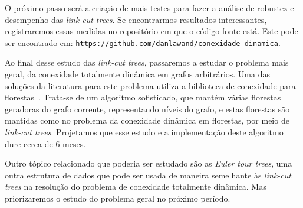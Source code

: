 O próximo passo será a criação de mais testes para fazer a análise de robustez e desempenho das \emph{link-cut trees}. Se encontrarmos resultados interessantes, registraremos essas medidas no repositório em que o código fonte está. Este pode ser encontrado em: \texttt{https://github.com/danlawand/conexidade-dinamica}.  

Ao final desse estudo das \emph{link-cut trees}, passaremos a estudar o problema mais geral, da conexidade totalmente dinâmica em grafos arbitrários.  Uma das soluções da literatura para este problema utiliza a biblioteca de conexidade para florestas~\cite{HolmLT2001}. 
Trata-se de um algoritmo sofisticado, que mantém várias florestas geradoras do grafo corrente, representando níveis do grafo, e estas florestas são mantidas como no problema da conexidade dinâmica em florestas, por meio de \emph{link-cut trees}.  Projetamos que esse estudo e a implementação deste algoritmo dure cerca de 6 meses. 

Outro tópico relacionado que poderia ser estudado são as \emph{Euler tour trees}, uma outra estrutura de dados que pode ser usada de maneira semelhante às \emph{link-cut trees} na resolução do problema de conexidade totalmente dinâmica.  Mas priorizaremos o estudo do problema geral no próximo período. 

